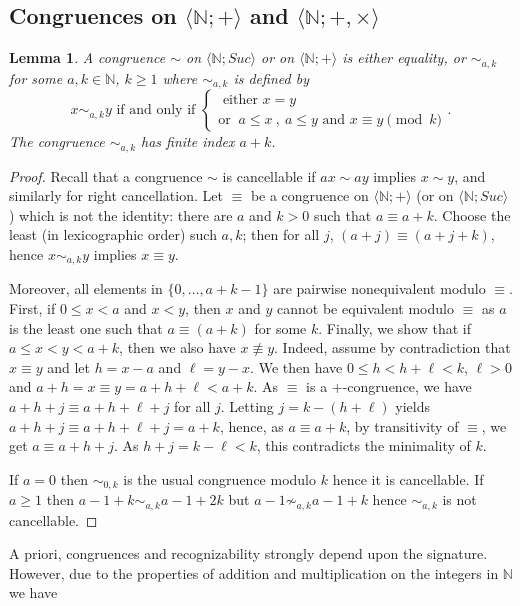 \documentclass[11pt,a4paper]{article}
\newtheorem{lemma}[theorem]{Lemma}
\theoremstyle{definition} %
\newcommand\+[1]{\mathcal{#1}} %
\newcommand{\N}{{\mathbb N}}     %
\begin{document}
\subsection{Congruences on $\langle\N;+\rangle$ and $\langle\N;+,\times\rangle$}\label{ss CN+}
\begin{lemma} \label{folk0} A  congruence $\sim$  on $\langle  \N ;Suc\rangle$ or on $\langle  \N ;+\rangle$ is either  equality, or $\sim_{a,k}$ for some $a,k\in\N$, $k\geq1$ where $\sim_{a,k}$  is defined by
\begin{equation}\label{equation:ak}
x\sim_{a,k } y \mbox{  if and only if  }\begin{cases} \mbox{ either } x=y\\
\mbox{or }\  a \leq x\ ,\  a \leq y \mbox{ and }x\equiv  y\pmod k
\end{cases}.
\end{equation}
The congruence $\sim_{a,k}$ has finite index $a+k$.
\end{lemma}
\begin{proof} Recall that a congruence $\sim$ is cancellable if $ax\sim ay $ implies $x\sim y $, and similarly for right cancellation. Let  $\equiv$ be a congruence on $\langle \N;+\rangle$ (or on $\langle  \N ;Suc\rangle$) which is not the identity: there are $a$ and $k>0$ such that $a\equiv a+k$. Choose the least (in lexicographic order) such $a,k$; then for all $j$, $(a+j)\equiv(a+j+k)$, hence $x\sim_{a,k } y$ implies $x\equiv y$. 

Moreover, all elements in $\{0,\ldots,a+k-1\}$ are pairwise nonequivalent modulo $\equiv$. 
First, if $0\leq x<a$ and $x < y $, then $x$ and $y$ cannot be equivalent modulo $\equiv$ as $a$ is the least one such that $a\equiv(a+k)$ for some $k$.  
 Finally, we show that if  $a \leq x<y<a+k$, then we also have $x\not\equiv y$.
Indeed, assume by contradiction that $x\equiv y$ and let $h=x-a$ and $\ell=y-x$. 
We then have $0\leq h< h+\ell<k$, $\ell>0$ and $a+h=x\equiv y=a+h+\ell<a+k$. 
As $\equiv$ is a +-congruence, we have $a+h+j\equiv a+h+\ell+j$ for all $j$.
Letting $j=k-(h+\ell)$ yields $a+h+j\equiv a+h+\ell+j=a+k$, hence, as $a\equiv a+k$,  by transitivity of $\equiv$, we get $a\equiv a+h+j$. As $h+j=k-\ell<k$, this contradicts the minimality of $k$.

If $a=0$ then  $\sim_{0,k}$ is the usual congruence modulo $k$ hence it is cancellable.
If $a\geq1$ then $a-1+k\sim_{a,k}a-1+2k$ but $a-1\not\sim_{a,k}a-1+k$
 hence $\sim_{a,k}$ is not cancellable.
  \end{proof}
\fi
%
A priori, congruences and recognizability 
strongly depend upon the signature. However, due to the properties of addition and multiplication on the integers in $\N$  we have
\end{document}

